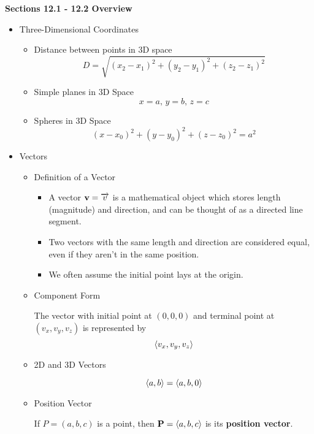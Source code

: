 \newcommand{\thetitle}{
  Stewart's Calculus Chapter 12-16 Notes
}





\centerline{\bf Sections 12.1 - 12.2 Overview }

\begin{itemize}
\item Three-Dimensional Coordinates

  \begin{itemize}
  \item Distance between points in 3D space
    \[D = \sqrt{(x_2 - x_1)^2 + (y_2 - y_1)^2 + (z_2 - z_1)^2}\]
    
  \item Simple planes in 3D Space
    \[x=a,\, y=b,\, z=c\]
  
  \item Spheres in 3D Space
    \[(x-x_0)^2 + (y-y_0)^2 + (z-z_0)^2 = a^2\]
  \end{itemize}

\item Vectors
  \begin{itemize}
  \item Definition of a Vector
  
    \begin{itemize}
    \item A vector $\mathbf{v}=\overrightarrow{v}$ is a mathematical object which stores length (magnitude) and direction, and can be thought of as a directed line segment.
  
    \item Two vectors with the same length and direction are considered equal, even if they aren't in the same position. 

    \item We often assume the initial point lays at the origin.
    \end{itemize}
    
  \item Component Form
  
    The vector with initial point at $(0,0,0)$ and terminal point at $(v_x,v_y,v_z)$ is represented by \[\left<v_x,v_y,v_z\right>\]
    
  \item 2D and 3D Vectors
  
    \[\left<a,b\right>=\left<a,b,0\right>\]
    
  \item Position Vector
  
    If $P=(a,b,c)$ is a point, then $\mathbf{P}=\left<a,b,c\right>$ is its \textbf{position vector}. 


\end{itemize}
\end{itemize}
